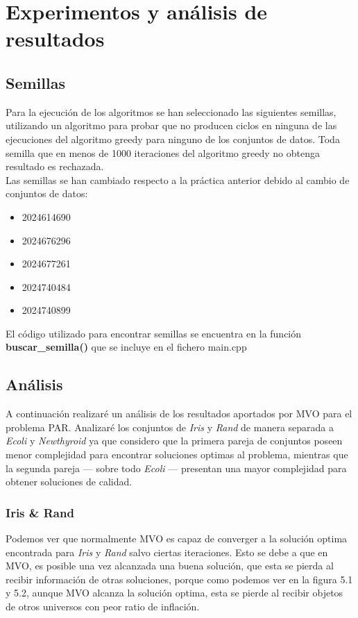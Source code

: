 \chapter{Experimentos y análisis de resultados}
\section{Semillas}
Para la ejecución de los algoritmos se han seleccionado las siguientes semillas, utilizando un algoritmo para probar que no producen ciclos en ninguna de las ejecuciones del algoritmo greedy para ninguno de los conjuntos de datos. Toda semilla que en menos de 1000 iteraciones del algoritmo greedy no obtenga resultado es rechazada. \\
Las semillas se han cambiado respecto a la práctica anterior debido al cambio de conjuntos de datos:
\begin{itemize}
   \item 2024614690
   \item 2024676296
   \item 2024677261
   \item 2024740484
   \item 2024740899
\end{itemize}


El código utilizado para encontrar semillas se encuentra en la función \textbf{buscar\_semilla()} que se incluye en el fichero main.cpp


\section{Análisis}
A continuación realizaré un análisis de los resultados aportados por MVO para el problema PAR. Analizaré los conjuntos de \emph{Iris} y \emph{Rand} de manera separada a \emph{Ecoli} y \emph{Newthyroid} ya que considero que la primera pareja de conjuntos poseen menor complejidad para encontrar soluciones optimas al problema, mientras que la segunda pareja --- sobre todo \emph{Ecoli} --- presentan una mayor complejidad para obtener soluciones de calidad.

\subsection{Iris \& Rand}
Podemos ver que normalmente MVO es capaz de converger a la solución optima encontrada para \emph{Iris} y \emph{Rand} salvo ciertas iteraciones. Esto se debe a que en MVO, es posible una vez alcanzada una buena solución, que esta se pierda al recibir información de otras soluciones, porque como podemos ver en la figura 5.1 y 5.2, aunque MVO alcanza la solución optima, esta se pierde al recibir objetos de otros universos con peor ratio de inflación.

